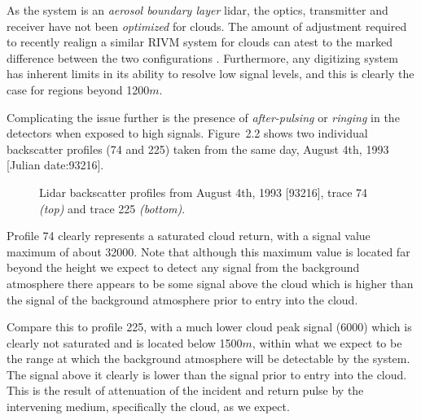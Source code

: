  
As the system is an {\em aerosol boundary layer} lidar, the optics,
transmitter and receiver have not been {\em optimized}
for clouds. The amount of adjustment required to recently realign 
a similar RIVM system for clouds can atest to the marked difference
between the two configurations \cite{evpd}. Furthermore, any digitizing
system has inherent limits in its ability to resolve low signal levels,
and this is clearly the case for regions beyond 1200$m$.

Complicating the issue further is the presence of {\em after-pulsing}
or {\em ringing} in the detectors when exposed to high signals.
Figure~{2.2} shows two individual backscatter profiles (74 and 225)
taken from the same day, August 4th, 1993 [Julian date:93216]. 

\begin{figure}
\vspace{5.0in}
\caption{Lidar backscatter profiles from August 4th, 1993 [93216], 
trace 74 {\em(top)} and trace 225 {\em(bottom)}.}
\end{figure}

Profile 74 clearly
represents a saturated cloud return, with a signal value maximum of about
32000. Note that although this maximum value is located far beyond the height
we expect to detect any signal from the background atmosphere there
appears to be some signal above the cloud which is
higher than the signal of the background atmosphere prior to entry
into the cloud. 

Compare this to profile 225, with a much lower cloud peak signal 
(6000) which is clearly not
saturated and is located below 1500$m$, within what we expect to 
be the range at which the background atmosphere will be detectable
by the system. The signal above it clearly is lower than the
signal prior to entry into the cloud. This is the result of
attenuation of the incident and return pulse by the intervening
medium, specifically the cloud, as we expect. 

